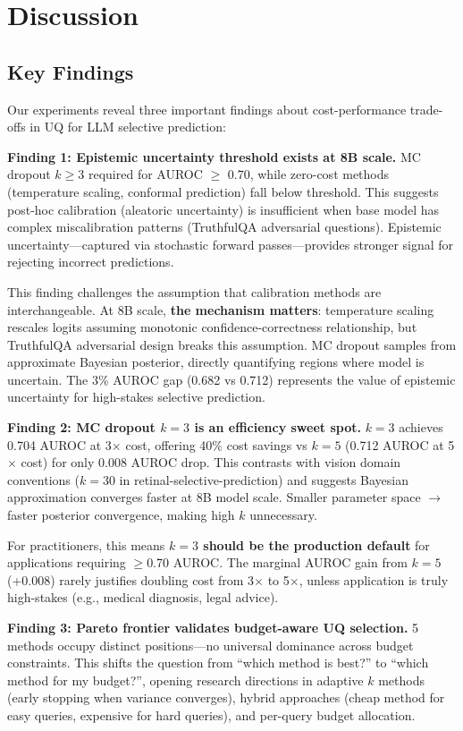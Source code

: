 \section{Discussion}

\subsection{Key Findings}

Our experiments reveal three important findings about cost-performance trade-offs in UQ for LLM selective prediction:

\textbf{Finding 1: Epistemic uncertainty threshold exists at 8B scale.} MC dropout $k\geq3$ required for AUROC $\geq$ 0.70, while zero-cost methods (temperature scaling, conformal prediction) fall below threshold. This suggests post-hoc calibration (aleatoric uncertainty) is insufficient when base model has complex miscalibration patterns (TruthfulQA adversarial questions). Epistemic uncertainty---captured via stochastic forward passes---provides stronger signal for rejecting incorrect predictions.

This finding challenges the assumption that calibration methods are interchangeable. At 8B scale, \textbf{the mechanism matters}: temperature scaling rescales logits assuming monotonic confidence-correctness relationship, but TruthfulQA adversarial design breaks this assumption. MC dropout samples from approximate Bayesian posterior, directly quantifying regions where model is uncertain. The 3\% AUROC gap (0.682 vs 0.712) represents the value of epistemic uncertainty for high-stakes selective prediction.

\textbf{Finding 2: MC dropout $k=3$ is an efficiency sweet spot.} $k=3$ achieves 0.704 AUROC at 3$\times$ cost, offering 40\% cost savings vs $k=5$ (0.712 AUROC at 5$\times$ cost) for only 0.008 AUROC drop. This contrasts with vision domain conventions ($k=30$ in retinal-selective-prediction) and suggests Bayesian approximation converges faster at 8B model scale. Smaller parameter space $\rightarrow$ faster posterior convergence, making high $k$ unnecessary.

For practitioners, this means \textbf{$k=3$ should be the production default} for applications requiring $\geq$0.70 AUROC. The marginal AUROC gain from $k=5$ (+0.008) rarely justifies doubling cost from 3$\times$ to 5$\times$, unless application is truly high-stakes (e.g., medical diagnosis, legal advice).

\textbf{Finding 3: Pareto frontier validates budget-aware UQ selection.} 5 methods occupy distinct positions---no universal dominance across budget constraints. This shifts the question from ``which method is best?'' to ``which method for my budget?'', opening research directions in adaptive $k$ methods (early stopping when variance converges), hybrid approaches (cheap method for easy queries, expensive for hard queries), and per-query budget allocation.

